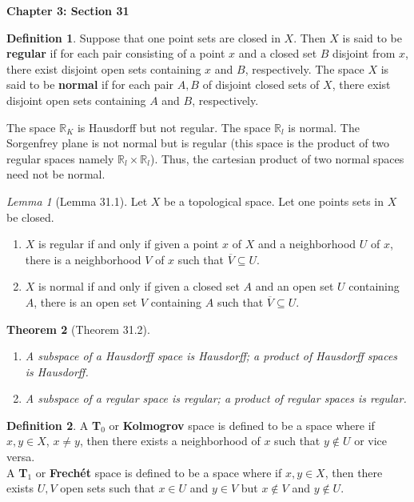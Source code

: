 \documentclass{article}
\newtheorem{theorem}{Theorem}
\theoremstyle{definition}
\newtheorem{definition}{Definition}[section]
\theoremstyle{remark}
\newtheorem{lemma}[theorem]{Lemma}
\begin{document}
    \newpage

    \textbf{Chapter 3: Section 31}

    \begin{definition}
        Suppose that one point sets are closed in $X$. Then $X$ is said to be \textbf{regular} if for each pair consisting of a point
        $x$ and a closed set $B$ disjoint from $x$, there exist disjoint open sets containing $x$ and $B$, respectively. The space $X$
        is said to be \textbf{normal} if for each pair $A,B$ of disjoint closed sets of $X$, there exist disjoint open sets
        containing $A$ and $B$, respectively.
    \end{definition}

    The space $\mathbb{R}_K$ is Hausdorff but not regular. The space $\mathbb{R}_l$ is normal. The Sorgenfrey plane is not normal but
    is regular (this space is the product of two regular spaces namely $\mathbb{R}_l\times \mathbb{R}_l$). Thus, the cartesian
    product of two normal spaces need not be normal.

    \begin{lemma}[Lemma 31.1]
        Let $X$ be a topological space. Let one points sets in $X$ be closed.
        \begin{enumerate}
            \item $X$ is regular if and only if given a point $x$ of $X$ and a neighborhood $U$ of $x$, there is a neighborhood
                $V$ of $x$ such that $\overline{V}\subseteq U$.
            \item $X$ is normal if and only if given a closed set $A$ and an open set $U$ containing $A$, there is an open set $V$
                containing $A$ such that $\overline{V}\subseteq U$.
        \end{enumerate}
    \end{lemma}

    \begin{theorem}[Theorem 31.2]
        \begin{enumerate}
            \item A subspace of a Hausdorff space is Hausdorff; a product of Hausdorff spaces is Hausdorff.
            \item A subspace of a regular space is regular; a product of regular spaces is regular.
        \end{enumerate}
    \end{theorem}

    \begin{definition}
        A \textbf{T}$_0$ or \textbf{Kolmogrov} space is defined to be a space where if $x,y\in X$, $x\neq y$, then there exists
        a neighborhood of $x$ such that $y\not\in U$ or vice versa.\\
        A \textbf{T}$_1$ or \textbf{Frechét} space is defined to be a space where if $x,y\in X$, then there exists $U,V$ open sets
        such that $x\in U$ and $y\in V$ but $x\not\in V$ and $y\not\in U$.
    \end{definition}
\end{document}
